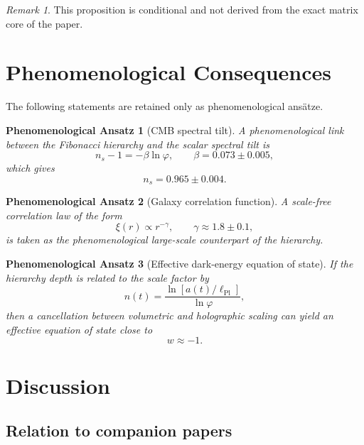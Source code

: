 \documentclass[
  aps,
  prd,
  reprint,
  superscriptaddress,
  nofootinbib,
  longbibliography,
  amsmath,
  amssymb
]{revtex4-2}
\newtheorem{ansatz}{Phenomenological Ansatz}
\theoremstyle{remark}
\newtheorem{remark}{Remark}
\newcommand{\lPl}{\ell_{\mathrm{Pl}}}
\newcommand{\phig}{\varphi}
\begin{document}
\begin{remark}
This proposition is conditional and not derived from the exact matrix core of the paper.
\end{remark}

\section{Phenomenological Consequences}
\label{sec:pheno}

The following statements are retained only as phenomenological ans\"atze.

\begin{ansatz}[CMB spectral tilt]
\label{ans:cmb}
A phenomenological link between the Fibonacci hierarchy and the scalar spectral tilt is
\begin{equation}
 n_s - 1 = -\beta \ln\phig,
 \qquad \beta=0.073\pm0.005,
\end{equation}
which gives
\begin{equation}
 n_s=0.965\pm0.004.
\end{equation}
\end{ansatz}

\begin{ansatz}[Galaxy correlation function]
\label{ans:lss}
A scale-free correlation law of the form
\begin{equation}
\xi(r)\propto r^{-\gamma},
\qquad \gamma\approx 1.8\pm0.1,
\end{equation}
is taken as the phenomenological large-scale counterpart of the hierarchy.
\end{ansatz}

\begin{ansatz}[Effective dark-energy equation of state]
\label{ans:w}
If the hierarchy depth is related to the scale factor by
\begin{equation}
 n(t)=\frac{\ln[a(t)/\lPl]}{\ln\phig},
\end{equation}
then a cancellation between volumetric and holographic scaling can yield an effective equation of state close to
\begin{equation}
 w\approx -1.
\end{equation}
\end{ansatz}

\section{Discussion}
\label{sec:discussion}

\subsection{Relation to companion papers}
\end{document}
